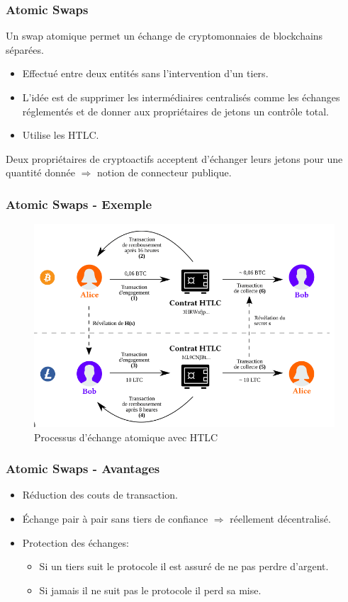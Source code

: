 \begin{frame}
  \frametitle{Atomic Swaps}
  Un swap atomique permet un échange de cryptomonnaies de blockchains séparées.
  \newline 
  \begin{itemize}
    \item Effectué entre deux entités sans l’intervention d’un tiers.
    \item L’idée est de supprimer les intermédiaires centralisés comme les échanges réglementés et de donner aux propriétaires de jetons un contrôle total.
    \item Utilise les HTLC. \newline
  \end{itemize}
    Deux propriétaires de cryptoactifs acceptent d’échanger leurs jetons pour une quantité donnée
  $\Rightarrow$ notion de connecteur publique.
\end{frame}

\begin{frame}
  \frametitle{Atomic Swaps - Exemple}
  \begin{figure}
    \includegraphics[scale = 0.35]{decentralisation/atomicswap.png}
  \caption{Processus d'échange atomique avec HTLC}
  \end{figure}
  
\end{frame}

\begin{frame}
  \frametitle{Atomic Swaps - Avantages}
  \subtitle{Avantages}
  \begin{itemize}
    \item Réduction des couts de transaction.
    \item Échange pair à pair sans tiers de confiance $\Rightarrow$ réellement décentralisé.
    \item Protection des échanges:
    \begin{itemize}
      \item Si un tiers suit le protocole il est assuré de ne pas perdre d'argent.
    \item Si jamais il ne suit pas le protocole il perd sa mise.
    \end{itemize} 
  \end{itemize}
\end{frame}

